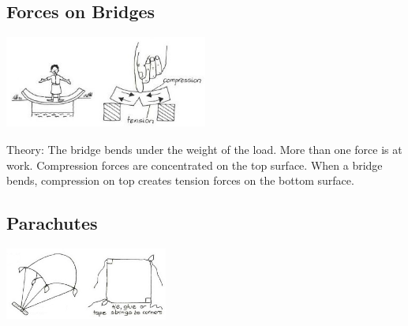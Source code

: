 \begin{multicols}{2}
\subsection{Forces on Bridges}

\begin{center}
\includegraphics[width=0.5\textwidth]{./img/vso/forces-bridges.jpg}
\end{center}

\begin{description*}
\item[Theory:]{The bridge bends under the
weight of the load. More than
one force is at work. Compression
forces are concentrated on the
top surface. When a bridge
bends, compression on top
creates tension forces on the
bottom surface.}
\end{description*}

\subsection{Parachutes} 

\begin{center}
\includegraphics[width=0.4\textwidth]{./img/vso/parachute.jpg}
\end{center}


\end{multicols}
